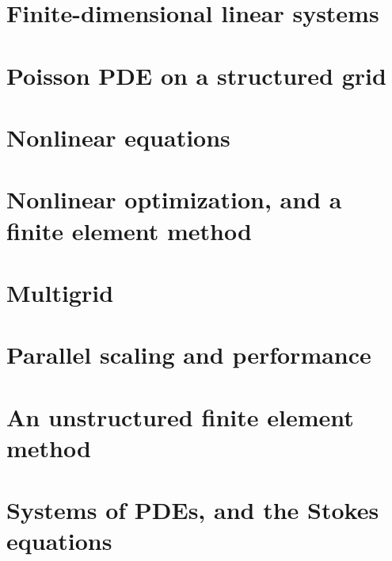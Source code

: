 \documentclass{tufte-book}
\newcommand{\CODELOC}{}  %
\newcommand{\stubinput}[2]{}
\newcommand{\stubinput}[2]{Percent completed: #2\%.}
\theoremstyle{definition}
\begin{document}
\chapter{Finite-dimensional linear systems}
\label{chap:linearsystem}
\renewcommand{\CODELOC}{c/ch2/}


\chapter{Poisson PDE on a structured grid}
\label{chap:structured}
\renewcommand{\CODELOC}{c/ch3/}


\chapter{Nonlinear equations}
\label{chap:nonlinear}
\renewcommand{\CODELOC}{c/ch4/}


\chapter{Nonlinear optimization, and a finite element method}
\label{chap:optifem}
\renewcommand{\CODELOC}{c/ch5/}
\stubinput{optifem.tex}{10}

\chapter{Multigrid}
\label{chap:multigrid}
\renewcommand{\CODELOC}{c/ch6/}
\stubinput{multigrid.tex}{20}

\chapter{Parallel scaling and performance}
\label{chap:scaling}
\renewcommand{\CODELOC}{c/ch7/}
\stubinput{scaling.tex}{5}

\chapter{An unstructured finite element method}
\label{chap:unstructured}
\renewcommand{\CODELOC}{c/ch8/}
\stubinput{unstructured.tex}{40}

\chapter{Systems of PDEs, and the Stokes equations}
\label{chap:stokes}
\renewcommand{\CODELOC}{c/ch9/}
\stubinput{stokes.tex}{5}
\end{document}

